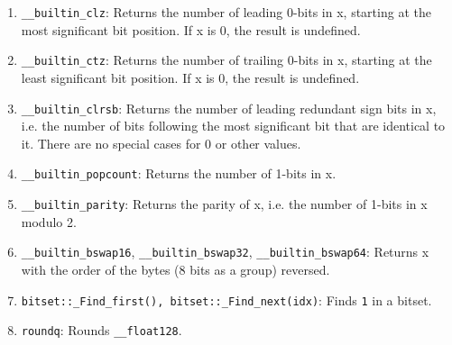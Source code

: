 \begin{enumerate}[noitemsep]
\item \texttt{\_\_builtin\_clz}: Returns the number of leading 0-bits in x, starting at the most significant bit position. If x is 0, the result is undefined.
\item \texttt{\_\_builtin\_ctz}: Returns the number of trailing 0-bits in x, starting at the least significant bit position. If x is 0, the result is undefined.
\item \texttt{\_\_builtin\_clrsb}: Returns the number of leading redundant sign bits in x, i.e. the number of bits following the most significant bit that are identical to it. There are no special cases for 0 or other values.
\item \texttt{\_\_builtin\_popcount}: Returns the number of 1-bits in x.
\item \texttt{\_\_builtin\_parity}: Returns the parity of x, i.e. the number of 1-bits in x modulo 2.
\item \texttt{\_\_builtin\_bswap16}, \texttt{\_\_builtin\_bswap32}, \texttt{\_\_builtin\_bswap64}: Returns x with the order of the bytes (8 bits as a group) reversed.
\item \texttt{bitset::\_Find\_first(), bitset::\_Find\_next(idx)}: Finds \texttt{1} in a bitset.
\item \texttt{roundq}: Rounds \texttt{\_\_float128}.
\end{enumerate}


